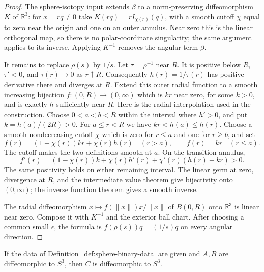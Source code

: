 \begin{proof}
The sphere-isotopy input extends $\beta$ to a norm-preserving
diffeomorphism $K$ of $\mathbb R^3$: for $x=rq\ne0$ take
$K(rq)=rI_{\chi(r)}(q)$, with a smooth cutoff $\chi$ equal to zero
near the origin and one on an outer annulus.  Near zero this is the
linear orthogonal map, so there is no polar-coordinate singularity;
the same argument applies to its inverse.  Applying $K^{-1}$ removes
the angular term $\beta$.

It remains to replace $\rho(s)$ by $1/s$.  Let
$\tau=\rho^{-1}$ near $R$.  It is positive below $R$,
$\tau'<0$, and $\tau(r)\to0$ as $r\uparrow R$.
Consequently $h(r)=1/\tau(r)$ has positive derivative there and
diverges at $R$.  Extend this outer radial function to a smooth
increasing bijection $f:(0,R)\to(0,\infty)$ which is $kr$ near zero,
for some $k>0$, and is exactly $h$ sufficiently near $R$.
Here is the radial interpolation used in the construction.  Choose
$0<a<b<R$ within the interval where $h'>0$, and put
$k=h(a)/(2R)>0$.  For $a\le r<R$ we have
$kr<h(a)\le h(r)$.  Choose a smooth nondecreasing cutoff $\chi$ which
is zero for $r\le a$ and one for $r\ge b$, and set
\[
 f(r)=(1-\chi(r))kr+\chi(r)h(r)\quad(r>a),
 \qquad f(r)=kr\quad(r\le a).
\]
The cutoff makes the two definitions smooth at $a$.  On the transition
annulus,
\[
 f'(r)=(1-\chi(r))k+\chi(r)h'(r)+\chi'(r)(h(r)-kr)>0.
\]
The same positivity holds on either remaining interval.  The linear
germ at zero, divergence at $R$, and the intermediate value theorem
give bijectivity onto $(0,\infty)$; the inverse function theorem gives
a smooth inverse.

The radial diffeomorphism $x\mapsto f(\|x\|)x/\|x\|$ of
$B(0,R)$ onto $\mathbb R^3$ is linear near zero.
Compose it with $K^{-1}$ and the exterior ball chart.  After choosing
a common small $\epsilon$, the formula is
$f(\rho(s))q=(1/s)q$ on every angular direction.
\end{proof}

\begin{theorem}
\label{thm:binary-sphere-identity}
If the data of Definition~\ref{def:sphere-binary-data} are given and
$A,B$ are diffeomorphic to $S^3$, then $C$ is diffeomorphic to $S^3$.
\end{theorem}

